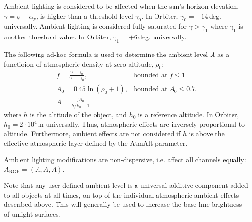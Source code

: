 \documentclass[Orbiter Technical Reference.tex]{subfiles}
\begin{document}
Ambient lighting is considered to be affected when the sun's horizon elevation, $\gamma = \phi-\alpha_p$, is higher than a threshold level $\gamma_0$. In Orbiter, $\gamma_0 = -14$\,deg. universally. Ambient lighting is considered fully saturated for $\gamma > \gamma_1$ where $\gamma_1$ is another threshold value. In Orbiter, $\gamma_1 = +6$\,deg. universally.

The following ad-hoc formula is used to determine the ambient level $A$ as a functioion of atmospheric density at zero altitude, $\rho_0$:
\begin{equation}
\begin{array}{ll}
f = \frac{\gamma-\gamma_0}{\gamma_1-\gamma_0}, & \text{bounded at}\; f \leq 1\\
A_0 = 0.45 \ln(\rho_0+1), & \text{bounded at}\; A_0 \leq 0.7.\\
A = \frac{f A_0}{h/h_0 +1} &
\end{array}
\end{equation}
where $h$ is the altitude of the object, and $h_0$ is a reference altitude. In Orbiter, $h_0 = 2\cdot10^4$\,m universally. Thus, atmospheric effects are inversely proportional to altitude. Furthermore, ambient effects are not considered if $h$ is above the effective atmospheric layer defined by the AtmAlt parameter.

Ambient lighting modifications are non-dispersive, i.e. affect all channels equally: $A_\text{RGB} = (A,A,A)$.

Note that any user-defined ambient level is a universal additive component added to all objects at all times, on top of the individual atmospheric ambient effects described above. This will generally be used to increase the base line brightness of unlight surfaces.
\end{document}
